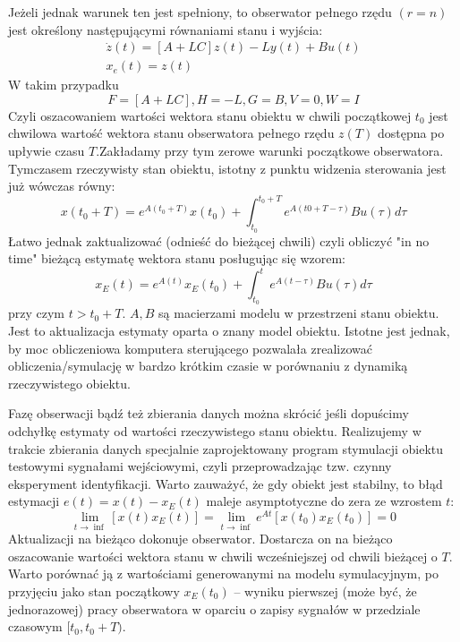\documentclass{article}
\begin{document}
		Jeżeli jednak warunek ten jest spełniony, to obserwator pełnego rzędu $(r=n)$ jest
		określony następującymi równaniami stanu i wyjścia:
		\begin{align*}
			\dot{z}(t) = [A + LC]z(t) - Ly(t) + Bu(t) \\ 
			x_e(t) = z(t)
		\end{align*}
		W takim przypadku
		\begin{equation}
			F = [A+LC], H = -L , G=B, V=0, W=I
		\end{equation}
		Czyli oszacowaniem wartości wektora stanu obiektu w chwili początkowej $t_0$
		jest chwilowa wartość wektora stanu obserwatora pełnego rzędu $z(T)$
		dostępna po upływie czasu $T$.Zakładamy przy tym zerowe warunki początkowe obserwatora.
		Tymczasem rzeczywisty stan obiektu, istotny z punktu widzenia sterowania jest już wówczas równy:
		\begin{equation}
			x(t_0+T) = e^{A(t_0+T)}x(t_0)+\int^{t_0+T}_{t_0}e^{A(t0+T-\tau)}Bu(\tau)d\tau
		\end{equation}
		Łatwo jednak zaktualizować (odnieść do bieżącej chwili) czyli obliczyć "in no time"
		bieżącą estymatę wektora stanu posługując się wzorem:
		\begin{equation}
			x_E(t) = e^{A(t)} x_E(t_0)+\int^t_{t_0}e^{A(t-\tau)} Bu(\tau)d\tau
		\end{equation}
		przy czym $t > t_0 + T$. $A, B$ są macierzami modelu w przestrzeni stanu obiektu. Jest to
		aktualizacja estymaty oparta o znany model obiektu. Istotne jest jednak, by moc
		obliczeniowa komputera sterującego pozwalała zrealizować obliczenia/symulację w
		bardzo krótkim czasie w porównaniu z dynamiką rzeczywistego obiektu.

		Fazę obserwacji bądź też zbierania danych można skrócić jeśli dopuścimy
		odchyłkę estymaty od wartości rzeczywistego stanu obiektu.
		Realizujemy w trakcie zbierania danych specjalnie zaprojektowany program 
		stymulacji obiektu testowymi sygnałami wejściowymi, czyli przeprowadzając 
		tzw. czynny eksperyment identyfikacji.
		Warto zauważyć, że gdy obiekt jest stabilny, to błąd estymacji $e(t)=x(t)-x_E(t)$ maleje
		asymptotyczne do zera ze wzrostem $t$:
		\begin{equation}
			\lim_{t \to \inf} [ x(t) x_E (t)] = \lim_{t \to \inf} e^{At}[ x(t_0) x_E (t_0)] = 0 
		\end{equation}
		Aktualizacji na bieżąco dokonuje obserwator. Dostarcza on na bieżąco oszacowanie
		wartości wektora stanu w chwili wcześniejszej od chwili bieżącej o $T$.
		Warto porównać ją z wartościami
		generowanymi na modelu symulacyjnym, po przyjęciu jako stan początkowy $x_E (t_0)$ –
		wyniku pierwszej (może być, że jednorazowej) pracy obserwatora w oparciu o zapisy
		sygnałów w przedziale czasowym $[t_0 , t_0+ T)$.
\end{document}
